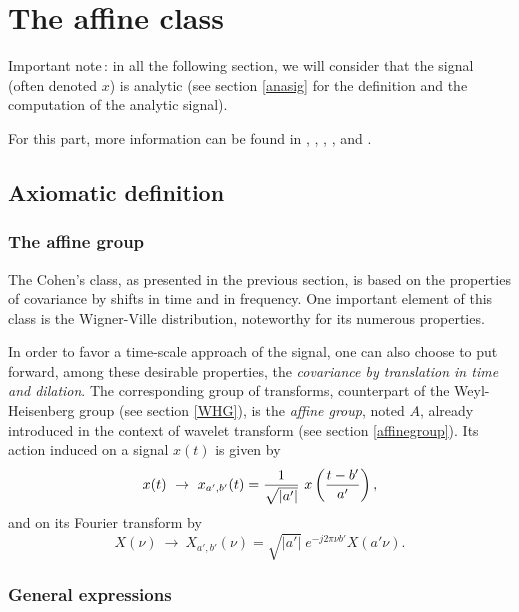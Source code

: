 
\section{The affine class}

Important note\,: in all the following section, we will consider that the
signal (often denoted $x$) is analytic (see section \ref{anasig} for the
definition and the computation of the analytic signal).

For this part, more information can be found in \cite{FLA93}, \cite{BER92},
\cite{GON93}, \cite{GON96}, \cite{OVA94} and \cite{RIO92}.


\subsection{Axiomatic definition}
\subsubsection{The affine group}

  The Cohen's class, as presented in the previous section, is based on the
properties of covariance by shifts in time and in frequency. One important
element of this class is the Wigner-Ville distribution, noteworthy for its
numerous properties.

   In order to favor a time-scale approach of the signal, one can also
choose to put forward, among these desirable properties, the {\it
covariance by translation in time and dilation}. The corresponding group of
transforms, counterpart of the Weyl-Heisenberg group (see section
\ref{WHG}), is the {\it affine group}, noted $A$,
already introduced in the context of wavelet transform (see section
\ref{affinegroup}). Its action induced on a signal $x(t)$ is given by
\[x(t) \ \rightarrow\
x_{a',b'}(t)={1\over\sqrt{|a'|}}\ x\left({t-b'\over a'}\right),\] 
and on its Fourier transform by
\[X(\nu) \ \rightarrow\  X_{a',b'}(\nu)=\sqrt{|a'|}\ e^{-j2\pi\nu b'}
X(a'\nu).\] 

\subsubsection{General expressions}

